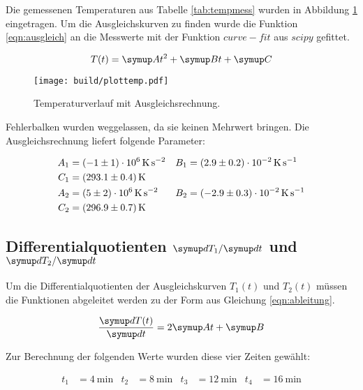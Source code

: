 Die gemessenen Temperaturen aus Tabelle \ref{tab:tempmess} wurden in Abbildung
\ref{fig:templot} eingetragen.
Um die Ausgleichskurven zu finden wurde die Funktion \eqref{eqn:ausgleich} an die
Messwerte mit der Funktion $curve-fit$ aus $scipy$ \cite{scipy} gefittet.

\begin{equation}
  T(t) = \g{A}t^2 + \g{B}t + \g{C}
  \label{eqn:ausgleich}
\end{equation}

\begin{figure}
  \centering
  \texttt{[image: build/plottemp.pdf]}
  \caption{Temperaturverlauf mit Ausgleichsrechnung.}
  \label{fig:templot}
\end{figure}

Fehlerbalken wurden weggelassen, da sie keinen Mehrwert bringen.
Die Ausgleichsrechnung liefert folgende Parameter:

\begin{align*}
  A_1 &= \SI{-1 +- 1 e6}{\kelvin\per\second\squared} &B_1 &= \SI{2.9(2)e-2}{\kelvin\per\second}\\
  C_1 &= \SI{293.1 +- 0.4}{\kelvin}\\
  A_2 &= \SI{5 +- 2 e6}{\kelvin\per\second\squared} &B_2 &= \SI{-2.9(3)e-2}{\kelvin\per\second}\\
  C_2 &= \SI{296.9(7)}{\kelvin}
\end{align*}

\subsection{Differentialquotienten $\g{d}T_1/\g{d}t$ und $\g{d}T_2/\g{d}t$}

Um die Differentialquotienten der Ausgleichskurven $T_1(t)$ und $T_2(t)$ müssen
die Funktionen abgeleitet werden zu der Form aus Gleichung \eqref{eqn:ableitung}.

\begin{equation}
  \frac{\g{d}T(t)}{\g{d}t} = 2 \g{A} t + \g{B}
  \label{eqn:ableitung}
\end{equation}

Zur Berechnung der folgenden Werte wurden diese vier Zeiten gewählt:

\begin{align*}
  t_1 &= \SI{4}{\minute} & t_2 &= \SI{8}{\minute} & t_3 &= \SI{12}{\minute} & t_4 &= \SI{16}{\minute}
\end{align*}

